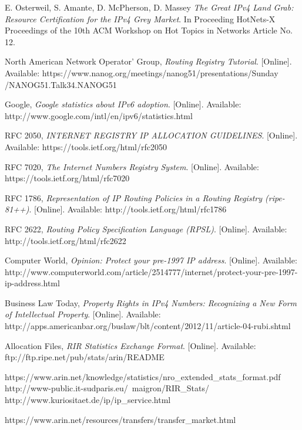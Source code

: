 \documentclass[11pt,a4paper]{scrreprt}
\begin{document}
\begin{thebibliography}{count}
	E. Osterweil, S. Amante, D. McPherson, D. Massey
	\emph{The Great IPv4 Land Grab: Resource Certification for the
IPv4 Grey Market}.
	In Proceeding HotNets-X Proceedings of the 10th ACM Workshop on Hot Topics in Networks Article No. 12.
 
	North American Network Operator' Group,
	\emph{Routing Registry Tutorial}.
	[Online]. Available: https://www.nanog.org/meetings/nanog51/presentations/Sunday
	/NANOG51.Talk34.NANOG51%
	
	Google,
	\emph{Google statistics about IPv6 adoption}.
	[Online]. Available: http://www.google.com/intl/en/ipv6/statistics.html	
	
	RFC 2050,
	\emph{INTERNET REGISTRY IP ALLOCATION GUIDELINES}.
	[Online]. Available: https://tools.ietf.org/html/rfc2050	
	
	RFC 7020,
	\emph{The Internet Numbers Registry System}.
	[Online]. Available: https://tools.ietf.org/html/rfc7020
	
	RFC 1786,
	\emph{Representation of IP Routing Policies in a Routing Registry (ripe-81++)}.
	[Online]. Available: http://tools.ietf.org/html/rfc1786
	
	RFC 2622,
	\emph{Routing Policy Specification Language (RPSL)}.
	[Online]. Available: http://tools.ietf.org/html/rfc2622
	
	
	Computer World,
	\emph{Opinion: Protect your pre-1997 IP address}.
	[Online]. Available: http://www.computerworld.com/article/2514777/internet/protect-your-pre-1997-ip-address.html
	
	Business Law Today,
	\emph{Property Rights in IPv4 Numbers: Recognizing a New Form of Intellectual Property}.
	[Online]. Available: http://apps.americanbar.org/buslaw/blt/content/2012/11/article-04-rubi.shtml
	
	Allocation Files,
	\emph{RIR Statistics Exchange Format}.
	[Online]. Available: ftp://ftp.ripe.net/pub/stats/arin/README
	

https://www.arin.net/knowledge/statistics/nro\_extended\_stats\_format.pdf
http://www-public.it-sudparis.eu/~maigron/RIR\_Stats/
http://www.kuriositaet.de/ip/ip\_service.html

	
	https://www.arin.net/resources/transfers/transfer\_market.html
	
\end{thebibliography}	
\end{document}

